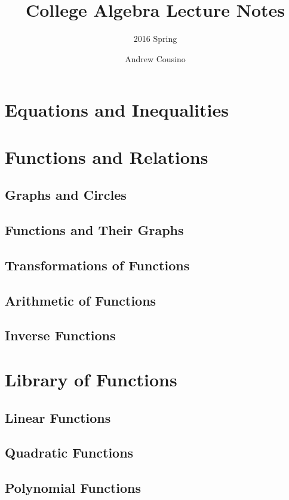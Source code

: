 \documentclass[oneside]{scrbook}
\begin{document}
\title{College Algebra Lecture Notes}
\subtitle{2016 Spring}
\author{Andrew Cousino}
\maketitle

\frontmatter
\tableofcontents
\listoffigures
\listoftables

\mainmatter
\part{Equations and Inequalities}







\part{Functions and Relations}
\chapter{Graphs and Circles}
\chapter{Functions and Their Graphs}
\chapter{Transformations of Functions}
\chapter{Arithmetic of Functions}
\chapter{Inverse Functions}

\part{Library of Functions}
\chapter{Linear Functions}
\chapter{Quadratic Functions}
\chapter{Polynomial Functions}
\end{document}
